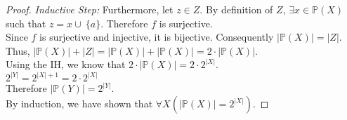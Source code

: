 \documentclass{article}
\newcommand{\union}{\cup\:}
\newcommand{\power}{\mathbb{P}}
\newenvironment{case}[1][Case]
    {\par\textit{#1:}\hfill\break}
    {}
\begin{document}
\begin{enumerate}
\begin{proof}
\begin{case}[Inductive Step]
        Furthermore, let $z \in Z$. By definition of $Z$, $\exists x \in \power(X)$ such that $z=x \union \{a\}$. Therefore $f$ is surjective.\\ 
        Since $f$ is surjective and injective, it is bijective. Consequently $|\power(X)|=|Z|$.\\
        Thus, $|\power(X)|+|Z|=|\power(X)|+|\power(X)|=2\cdot |\power(X)|$.\\
        Using the IH, we know that $2\cdot |\power(X)|=2 \cdot 2^{|X|}$.\\
        $2^{|Y|}=2^{|X|+1}=2 \cdot 2^{|X|}$\\
        Therefore $|\power(Y)| = 2^{|Y|}$.\\
        \end{case}
        By induction, we have shown that $\forall X(|\power(X)| = 2^{|X|})$.
    \end{proof}
\end{enumerate}
\end{document}
